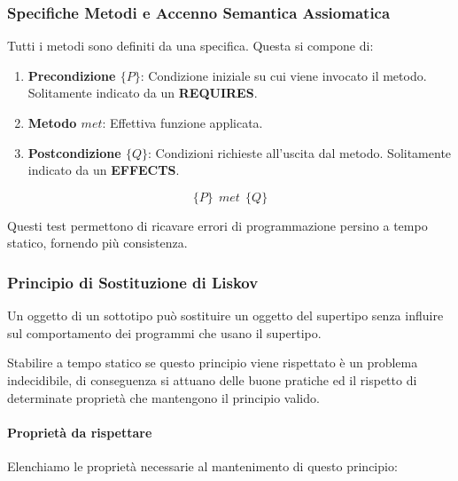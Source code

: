 \documentclass{article}
\begin{document}
\newpage

\subsubsection{Specifiche Metodi e Accenno Semantica Assiomatica}

Tutti i metodi sono definiti da una specifica. Questa si compone di:

\begin{enumerate}
    \item \textbf{Precondizione $\{P\}$}: Condizione iniziale su cui viene invocato il metodo. Solitamente indicato da un \textbf{REQUIRES}.
    \item \textbf{Metodo $met$}: Effettiva funzione applicata.
    \item \textbf{Postcondizione $\{Q\}$}: Condizioni richieste all'uscita dal metodo. Solitamente indicato da un \textbf{EFFECTS}.
\end{enumerate}

\vspace*{-8px}

\[ \{P\} \:\: met \:\: \{Q\} \]

Questi test permettono di ricavare errori di programmazione persino a tempo statico, fornendo più consistenza. 

\vspace*{8px}

\subsubsection{Principio di Sostituzione di Liskov}

Un oggetto di un sottotipo può sostituire un oggetto del supertipo
senza influire sul comportamento dei programmi che usano il
supertipo.

\vspace{8px}

Stabilire a tempo statico se questo principio viene rispettato è un problema indecidibile, di conseguenza si attuano delle buone pratiche ed il rispetto di determinate proprietà che mantengono il principio valido.

\vspace*{8px}

\paragraph{Proprietà da rispettare} Elenchiamo le proprietà necessarie al mantenimento di questo principio:
\end{document}
